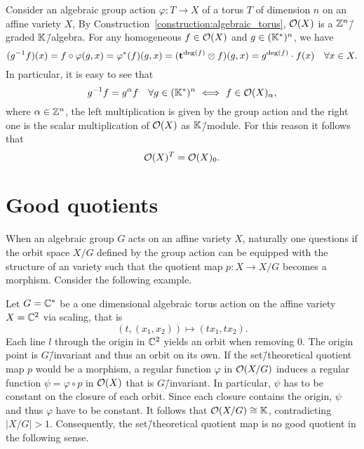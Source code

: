 \begin{ex}
	\label{example:regular_functions_torus_group_action}
	Consider an algebraic group action $\varphi\colon T \rightarrow X$ of a torus $T$ of dimension $n$ on an affine variety $X$, By Construction~\ref{construction:algebraic_torus}, $\mathcal{O}(X)$ is a $\mathbb{Z}^n$\=/graded $\mathbb{K}$\=/algebra. For any homogeneous $f\in\mathcal{O}(X)$ and $g\in (\mathbb{K}^*)^n$, we have
	$$(g^{-1}f)(x) = f \circ \varphi(g,x) = \varphi^*(f)(g,x) = (\mathbf{t}^{\deg(f)} \otimes f)(g,x) = g^{\deg(f)}\cdot f(x)\quad \forall x\in X.$$
	In particular, it is easy to see that
	$$g^{-1}f = g^\alpha f\quad \forall g\in (\field^*)^n \ \Longleftrightarrow \ f\in\O(X)_\alpha,$$
	where $\alpha\in\mathbb{Z}^n$, the left multiplication is given by the group action and the right one is the scalar multiplication of $\mathcal{O}(X)$ as $\mathbb{K}$\=/module.
	For this reason it follows that
	$$ \mathcal{O}(X)^T = \mathcal{O}(X)_0.$$
\end{ex}

\section{Good quotients}
When an algebraic group $G$ acts on an affine variety $X$, naturally one questions if the orbit space $X/G$ defined by the group action can be equipped with the structure of an variety such that the quotient map $p\colon X\rightarrow X/G$ becomes a morphism. Consider the following example.

\begin{ex}
	\label{example:bad_quotient}
	Let $G=\mathbb{C}^*$ be a one dimensional algebraic torus action on the affine variety $X = \mathbb{C}^2$ via scaling, that is
	$$(t,(x_1,x_2)) \mapsto (tx_1,tx_2).$$
	Each line $l$ through the origin in $\mathbb{C}^2$ yields an orbit when removing 0. The origin point is $G$\=/invariant and thus an orbit on its own.
	If the set\=/theoretical quotient map $p$ would be a morphism, a regular function $\varphi$ in $\mathcal{O}(X/G)$ induces a regular function $\psi = \varphi \circ p$ in $\mathcal{O}(X)$ that is $G$\=/invariant. In particular, $\psi$ has to be constant on the closure of each orbit. Since each closure contains the origin, $\psi$ and thus $\varphi$ have to be constant. It follows that $\mathcal{O}(X/G) \cong \mathbb{K}$, contradicting $|X/G| > 1$. Consequently, the set\=/theoretical quotient map is no good quotient in the following sense.
\end{ex}

